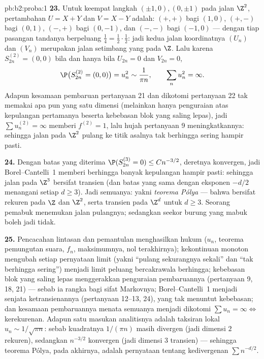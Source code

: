 \begin{solution}{pb:b2:proba:1}
\textbf{23.} Untuk keempat langkah $(\pm1, 0), (0, \pm1)$ pada
jalan $\Z^2$, pertambahan $U = X + Y$ dan $V = X - Y$
adalah: $(+,+)$ bagi $(1,0)$, $(+,-)$ bagi $(0,1)$, $(-,+)$ bagi
$(0,-1)$, dan $(-,-)$ bagi $(-1,0)$ --- dengan tiap pasangan tandanya
berpeluang $\frac14 = \frac12\cdot\frac12$: jadi kedua
jalan koordinatnya $(U_n)$ dan $(V_n)$ merupakan jalan setimbang yang 
pada $\Z$. Lalu karena $S^{(2)}_{2n} = (0,0)$ bila dan hanya bila $U_{2n} = 0$
dan $V_{2n} = 0$,
\[
\P\bigl(S^{(2)}_{2n} = (0,0)\bigr) = u_n^2 \sim \frac1{\pi
n}, \qquad \sum_nu_n^2 = \infty .
\]
Adapun kesamaan pembaruan pertanyaan 21 dan dikotomi
pertanyaan 22 tak memakai apa pun yang satu dimensi (melainkan hanya
penguraian atas kepulangan pertamanya beserta kebebasan blok yang
saling lepas), jadi $\sum u_n^{(2)} = \infty$ memberi $f^{(2)} =
1$, lalu hujah pertanyaan 9 meningkatkannya: sehingga jalan pada
$\Z^2$ pulang ke titik asalnya tak berhingga sering hampir pasti.

\textbf{24.} Dengan batas yang diterima $\P(S^{(3)}_{2n} = 0)
\leq Cn^{-3/2}$, deretnya konvergen, jadi Borel--Cantelli~1
memberi berhingga banyak kepulangan hampir pasti: sehingga jalan pada
$\Z^3$ bersifat transien (dan batas yang sama dengan eksponen $-d/2$
menangani setiap $d \geq 3$). Jadi semuanya: yakni \emph{teorema
Pólya} --- bahwa  bersifat rekuren pada $\Z$ dan
$\Z^2$, serta transien pada $\Z^d$ untuk $d \geq 3$. Seorang pemabuk menemukan
jalan pulangnya; sedangkan seekor burung yang mabuk boleh jadi tidak.

\textbf{25.} Pencacahan lintasan dan pemantulan menghasilkan hukum
 ($u_n$, teorema pemungutan suara, $f_n$, maksimumnya, nol
terakhirnya); kekontinuan monoton mengubah setiap pernyataan limit
(yakni ``pulang sekurangnya sekali'' dan ``tak berhingga sering'')
menjadi limit peluang bercakrawala berhingga;
kebebasan blok yang saling lepas menggerakkan penguraian
pembaruannya (pertanyaan 9, 18, 21) --- sebab ia rangka
 bagi sifat Markovnya; Borel--Cantelli~1 menjadi
senjata ketransienannya (pertanyaan 12--13, 24), yang tak menuntut
kebebasan; dan kesamaan pembaruannya menata semuanya menjadi
dikotomi $\sum u_n = \infty \iff$ kerekurenan. Adapun satu
masukan analitisnya adalah taksiran lokal $u_n \sim 1/\sqrt{\pi
n}$: sebab kuadratnya $1/(\pi n)$ masih divergen (jadi dimensi $2$
rekuren), sedangkan $n^{-3/2}$ konvergen (jadi dimensi $3$
transien) --- sehingga teorema Pólya, pada akhirnya, adalah pernyataan
tentang kedivergenan $\sum n^{-d/2}$.

\end{solution}
